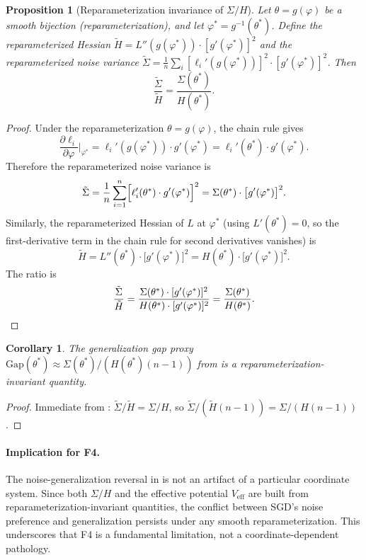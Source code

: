 \documentclass[11pt,a4paper]{article}
\newtheorem{proposition}[theorem]{Proposition}
\newtheorem{corollary}[theorem]{Corollary}
\newcommand{\Veff}{V_{\mathrm{eff}}}
\begin{document}
\begin{proposition}[Reparameterization invariance of $\Sigma/H$]
\label{prop:reparam}
Let $\theta = g(\varphi)$ be a smooth bijection (reparameterization), and
let $\varphi^* = g^{-1}(\theta^*)$.  Define the reparameterized Hessian
$\tilde{H} = L''(g(\varphi^*))\cdot [g'(\varphi^*)]^2$ and the
reparameterized noise variance
$\tilde{\Sigma} = \frac{1}{n}\sum_i [\ell_i'(g(\varphi^*))]^2\cdot [g'(\varphi^*)]^2$.
Then
\[
  \frac{\tilde{\Sigma}}{\tilde{H}} = \frac{\Sigma(\theta^*)}{H(\theta^*)}.
\]
\end{proposition}

\begin{proof}
Under the reparameterization $\theta = g(\varphi)$, the chain rule gives
\[
  \frac{\partial \ell_i}{\partial\varphi}\bigg|_{\varphi^*}
  = \ell_i'(g(\varphi^*))\cdot g'(\varphi^*)
  = \ell_i'(\theta^*)\cdot g'(\varphi^*).
\]
Therefore the reparameterized noise variance is
\[
  \tilde{\Sigma}
  = \frac{1}{n}\sum_{i=1}^{n}
    \Bigl[\ell_i'(\theta^*)\cdot g'(\varphi^*)\Bigr]^2
  = \Sigma(\theta^*)\cdot \bigl[g'(\varphi^*)\bigr]^2.
\]
Similarly, the reparameterized Hessian of $L$ at $\varphi^*$ (using
$L'(\theta^*)=0$, so the first-derivative term in the chain rule for
second derivatives vanishes) is
\[
  \tilde{H}
  = L''(\theta^*)\cdot\bigl[g'(\varphi^*)\bigr]^2
  = H(\theta^*)\cdot\bigl[g'(\varphi^*)\bigr]^2.
\]
The ratio is
\[
  \frac{\tilde{\Sigma}}{\tilde{H}}
  = \frac{\Sigma(\theta^*)\cdot[g'(\varphi^*)]^2}{H(\theta^*)\cdot[g'(\varphi^*)]^2}
  = \frac{\Sigma(\theta^*)}{H(\theta^*)}.
  \qedhere
\]
\end{proof}

\begin{corollary}
\label{cor:gap-intrinsic}
The generalization gap proxy $\mathrm{Gap}(\theta^*) \approx \Sigma(\theta^*)/(H(\theta^*)(n-1))$ from  is a reparameterization-invariant quantity.
\end{corollary}

\begin{proof}
Immediate from : $\tilde{\Sigma}/\tilde{H} = \Sigma/H$,
so $\tilde{\Sigma}/(\tilde{H}(n-1)) = \Sigma/(H(n-1))$.
\end{proof}

\paragraph{Implication for F4.}
The noise-generalization reversal in  is not an artifact of a
particular coordinate system.  Since both $\Sigma/H$ and the effective
potential $\Veff$ are built from reparameterization-invariant quantities, the
conflict between SGD's noise preference and generalization persists under any
smooth reparameterization.  This underscores that F4 is a fundamental
limitation, not a coordinate-dependent pathology.
\end{document}
